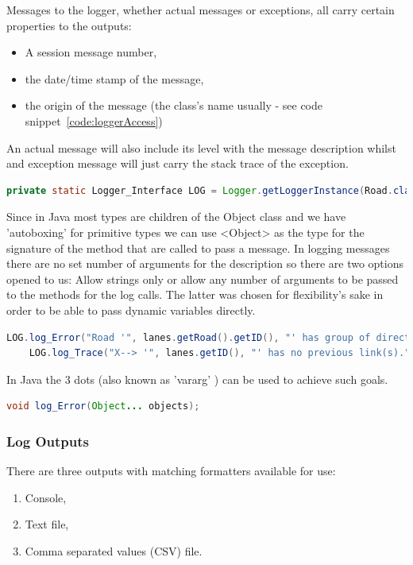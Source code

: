 Messages to the logger, whether actual messages or exceptions, all carry certain properties to the outputs:
\begin{itemize}
	\item A session message number,
	\item the date/time stamp of the message,
	\item the origin of the message (the class's name usually - see code snippet~\ref{code:loggerAccess})
\end{itemize}

An actual message will also include its level with the message description whilst and exception message will just carry the stack trace of the exception.

\begin{lstlisting}[language=java]
	private static Logger_Interface LOG = Logger.getLoggerInstance(Road.class.getSimpleName());
\end{lstlisting}

Since in Java most types are children of the Object class and we have 'autoboxing'\cite{Oracle1995} for primitive types we can use <Object> as the type for the signature of the method that are called to pass a message. In logging messages there are no set number of arguments for the description so there are two options opened to us: Allow strings only or allow any number of arguments to be passed to the methods for the log calls. The latter was chosen for flexibility's sake in order to be able to pass dynamic variables directly. 

\begin{lstlisting}[language=Java]
	LOG.log_Error("Road '", lanes.getRoad().getID(), "' has group of directed lanes with partly implemented Links (Back). ", link_count, "/", lanes.getNumberOfLanes(), " Lanes connected to a link.");
	LOG.log_Trace("X--> '", lanes.getID(), "' has no previous link(s).");
\end{lstlisting} 

In Java the 3 dots (also known as 'vararg' \cite{Oracle2004}) can be used to achieve such goals.

\begin{lstlisting}[language=Java]
	void log_Error(Object... objects);
\end{lstlisting}

\subsubsection{Log Outputs}
There are three outputs with matching formatters available for use:
\begin{enumerate}
	\item Console,
	\item Text file,
	\item Comma separated values (CSV) file.
\end{enumerate}

